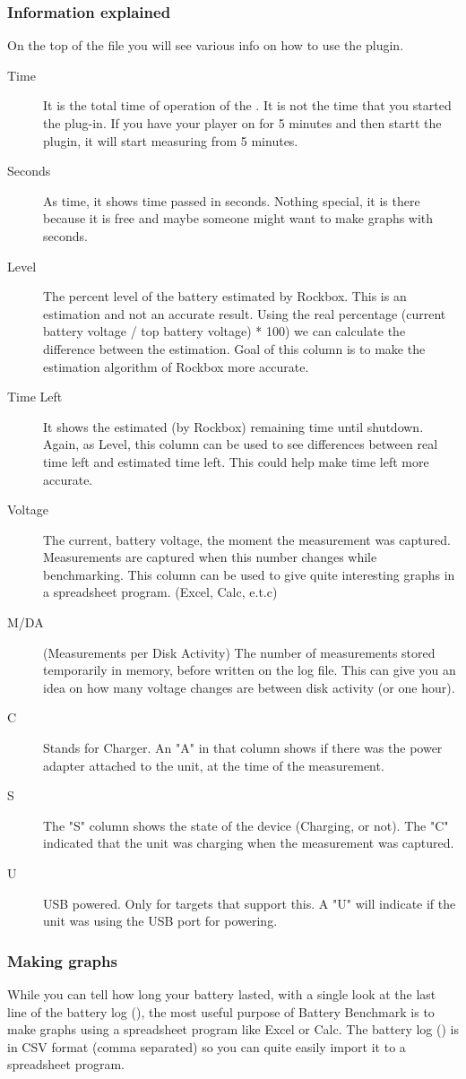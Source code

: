 \subsubsection{Information explained}
On the top of the file you will see various info on how to use the plugin.
\begin{description}
\item[Time] It is the total time of operation of the \dap. It is not the time
that you started the plug-in. If you have your player on for 5 minutes and then
startt the plugin, it will start measuring from 5 minutes.
\item[Seconds] As time, it shows time passed in seconds. Nothing special, it is
there because it is free and maybe someone might want to make graphs with
seconds.
\item[Level] The percent level of the battery estimated by Rockbox. This is an
estimation and not an accurate result. Using the real percentage (current
battery voltage / top battery voltage) * 100) we can calculate the difference
between the estimation. Goal of this column is to make the estimation algorithm
of Rockbox more accurate.
\item[Time Left] It shows the estimated (by Rockbox) remaining time until
shutdown. Again, as Level, this column can be used to see differences between
real time left and estimated time left. This could help make time left more
accurate.
\item[Voltage] The current, battery voltage, the moment the measurement was
captured. Measurements are captured when this number changes while benchmarking.
This column can be used to give quite interesting graphs in a spreadsheet
program. (Excel, Calc, e.t.c)
\item[M/DA] (Measurements per Disk Activity) The number of measurements stored
temporarily in memory, before written on the log file. This can give you an
idea on how many voltage changes are between disk activity (or one hour).
\item[C] Stands for Charger. An "A" in that column shows if there was the power
adapter attached to the unit, at the time of the measurement.
\item[S] The "S" column shows the state of the device (Charging, or not). The
"C" indicated that the unit was charging when the measurement was captured.
\item[U] USB powered. Only for targets that support this. A "U" will indicate
if the unit was using the USB port for powering. 
\end{description}

\subsubsection{Making graphs}
While you can tell how long your battery lasted, with a single look at the last
line of the battery log (), the most useful purpose of
Battery Benchmark is to make graphs using a spreadsheet program like Excel or
Calc. The battery log () is in CSV format (comma separated)
so you can quite easily import it to a spreadsheet program.

